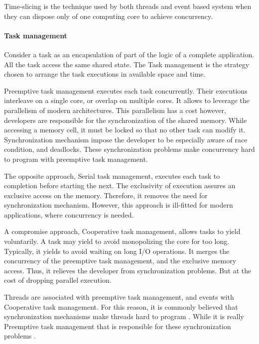 Time-slicing is the technique used by both threads and event based system when they can dispose only of one computing core to achieve concurrency.


\paragraph{Task management}

Consider a task as an encapsulation of part of the logic of a complete application.
All the task access the same shared state.
The Task management is the strategy chosen to arrange the task executions in available space and time.

Preemptive task management executes each task concurrently.
Their executions interleave on a single core, or overlap on multiple cores.
It allows to leverage the parallelism of modern architectures.
This parallelism has a cost however, developers are responsible for the synchronization of the shared memory.
While accessing a memory cell, it must be locked so that no other task can modify it.
Synchronization mechanism impose the developer to be especially aware of race condition, and deadlocks.
These synchronization problems make concurrency hard to program with preemptive task management.

The opposite approach, Serial task management, executes each task to completion before starting the next.
The exclusivity of execution assures an exclusive access on the memory.
Therefore, it removes the need for synchronization mechanism.
However, this approach is ill-fitted for modern applications, where concurrency is needed.

A compromise approach, Cooperative task management, allows tasks to yield voluntarily.
A task may yield to avoid monopolizing the core for too long.
Typically, it yields to avoid waiting on long I/O operations.
It merges the concurrency of the preemptive task management, and the exclusive memory access.
Thus, it relieves the developer from synchronization problems.
But at the cost of dropping parallel execution.

Threads are associated with preemptive task management, and events with Cooperative task management.
For this reason, it is commonly believed that synchronization mechanisms make threads hard to program \cite{Ousterhout1996}.
While it is really Preemptive task management that is responsible for these synchronization problems \cite{Adya2002}.

